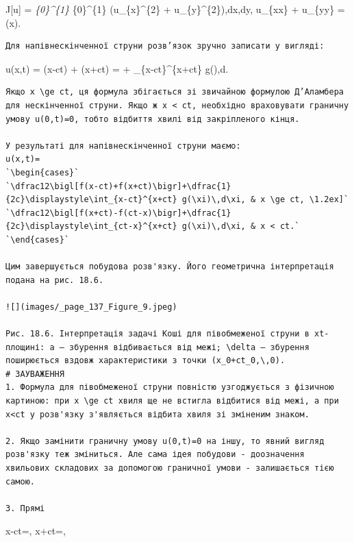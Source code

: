 \documentclass[
  ukrainian,
]{article}
\begin{document}
J{[}u{]} = \int\emph{\{0\}\^{}\{1\} \int}\{0\}\^{}\{1\}
(u\_\{x\}\^{}\{2\} + u\_\{y\}\^{}\{2\}),dx,dy, u\_\{xx\} + u\_\{yy\} =
\sin(\pi x).

\begin{verbatim}
Для напівнескінченної струни розв’язок зручно записати у вигляді:
\end{verbatim}

u(x,t) = \varphi(x-ct) + \psi(x+ct) =
\bigl[f(x-ct) + f(x+ct)\bigr] + 
\int\_\{x-ct\}\^{}\{x+ct\} g(\xi),d\xi.

\begin{verbatim}
Якщо x \ge ct, ця формула збігається зі звичайною формулою Д’Аламбера для нескінченної струни. Якщо ж x < ct, необхідно враховувати граничну умову u(0,t)=0, тобто відбиття хвилі від закріпленого кінця.

У результаті для напівнескінченної струни маємо:
u(x,t)=
`\begin{cases}`
`\dfrac12\bigl[f(x-ct)+f(x+ct)\bigr]+\dfrac{1}{2c}\displaystyle\int_{x-ct}^{x+ct} g(\xi)\,d\xi, & x \ge ct, \1.2ex]`
`\dfrac12\bigl[f(x+ct)-f(ct-x)\bigr]+\dfrac{1}{2c}\displaystyle\int_{ct-x}^{x+ct} g(\xi)\,d\xi, & x < ct.`
`\end{cases}`

Цим завершується побудова розв'язку. Його геометрична інтерпретація подана на рис. 18.6.

![](images/_page_137_Figure_9.jpeg)

Рис. 18.6. Інтерпретація задачі Коші для півобмеженої струни в xt-площині: a — збурення відбивається від межі; \delta — збурення поширюється вздовж характеристики з точки (x_0+ct_0,\,0).
# ЗАУВАЖЕННЯ
1. Формула для півобмеженої струни повністю узгоджується з фізичною картиною: при x \ge ct хвиля ще не встигла відбитися від межі, а при x<ct у розв'язку з'являється відбита хвиля зі зміненим знаком.

2. Якщо замінити граничну умову u(0,t)=0 на іншу, то явний вигляд розв'язку теж зміниться. Але сама ідея побудови - доозначення хвильових складових за допомогою граничної умови - залишається тією самою.

3. Прямі
\end{verbatim}

x-ct=, \qquad x+ct=,
\end{document}
